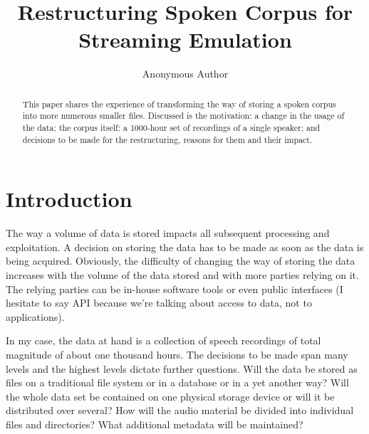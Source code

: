 \documentclass[runningheads]{llncs}
\begin{document}
%
\title{Restructuring Spoken Corpus for Streaming Emulation}
%
%
\author{Anonymous Author}
%
%
%
\maketitle              %
%

\begin{abstract}
This paper shares the experience of transforming the way of storing a spoken
corpus into more numerous smaller files. Discussed is the motivation: a change
in the usage of the data; the corpus itself: a 1000-hour set of recordings of a
single speaker; and decisions to be made for the restructuring, reasons for them
and their impact.
\end{abstract}

\section{Introduction}

The way a volume of data is stored impacts all subsequent processing and
exploitation\cite{reppen2010building}. A decision on storing the data has to be made as soon as the
data is being acquired. Obviously, the difficulty of changing the way of storing
the data increases with the volume of the data stored and with more parties relying
on it. The relying parties can be in-house software tools or even public
interfaces (I hesitate to say API because we're talking about access to data,
not to applications).

In my case, the data at hand is a collection of speech recordings of total
magnitude of about one thousand hours. The decisions to be made span many levels
and the highest levels dictate further questions. Will the data be stored as
files on a traditional file system or in a database or in a yet another way?
Will the whole data set be contained on one physical storage device or will it
be distributed over several? How will the audio material be divided into
individual files and directories? What additional metadata will be
maintained?\cite{crowdy1993spoken}
\end{document}
